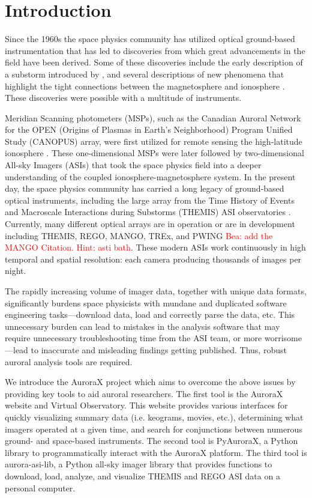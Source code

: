 \documentclass[utf8]{FrontiersinHarvard} %
\begin{document}
\section{Introduction}\label{intro}
Since the 1960s the space physics community has utilized optical ground-based instrumentation that has led to discoveries from which great advancements in the field have been derived. Some of these discoveries include the early description of a substorm introduced by \citet{Akasofu1964}, and several descriptions of new phenomena that highlight the tight connections between the magnetosphere and ionosphere \cite[e.g.][]{Angelopoulos2008, Jones2013, Shumko2021}. These discoveries were possible with a multitude of instruments. 

Meridian Scanning photometers (MSPs), such as the Canadian Auroral Network for the OPEN (Origins of Plasmas in Earth's Neighborhood) Program Unified Study (CANOPUS) array, were first utilized for remote sensing the high-latitude ionosphere \citep[e.g.][]{Rostoker1995}. These one-dimensional MSPs were later followed by two-dimensional All-sky Imagers (ASIs) that took the space physics field into a deeper understanding of the coupled ionosphere-magnetosphere system. In the present day, the space physics community has carried a long legacy of ground-based optical instruments, including the large array from the Time History of Events and Macroscale Interactions during Substorms (THEMIS) ASI observatories \citep{Donovan2006, Mende2009}. Currently, many different optical arrays are in operation or are in development including THEMIS, REGO, MANGO, TREx, and PWING  \citep[e.g.][]{Liang2016, Shiokawa2017, Lyons2019, Gillies2019} \textcolor{red}{Bea: add the MANGO Citation. Hint: asti bath}. These modern ASIs work continuously in high temporal and spatial resolution: each camera producing thousands of images per night.

The rapidly increasing volume of imager data, together with unique data formats, significantly burdens space physicists with mundane and duplicated software engineering tasks---download data, load and correctly parse the data, etc. This unnecessary burden can lead to mistakes in the analysis software that may require unnecessary troubleshooting time from the ASI team, or more worrisome---lead to inaccurate and misleading findings getting published. Thus, robust auroral analysis tools are required.

We introduce the AuroraX project which aims to overcome the above issues by providing key tools to aid auroral researchers. The first tool is the AuroraX website and Virtual Observatory. This website provides various interfaces for quickly visualizing summary data (i.e. keograms, movies, etc.), determining what imagers operated at a given time, and search for conjunctions between numerous ground- and space-based instruments. The second tool is PyAuroraX, a Python library to programmatically interact with the AuroraX platform. The third tool is aurora-asi-lib, a Python all-sky imager library that provides functions to download, load, analyze, and visualize THEMIS and REGO ASI data on a personal computer. 
\end{document}
